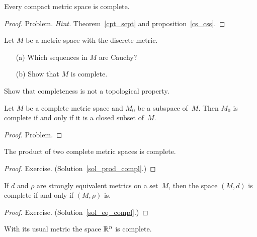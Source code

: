 \begin{prop}\label{prop_cpt_impl_cmpl} Every compact metric space is complete.
\end{prop}

\begin{proof} Problem. \emph{Hint.} Theorem~\ref{cpt_scpt} and
proposition~\ref{cs_css}.  \ns  \end{proof}

\begin{prob} Let $M$ be a metric space with the discrete metric.
 \begin{enumerate}
  \item[(a)] Which sequences in $M$ are Cauchy?
  \item[(b)] Show that $M$ is complete.
 \end{enumerate}
\end{prob}

\begin{prob} Show that completeness is not a topological property.
\end{prob}

\begin{prop}\label{prop_clss_ms} Let $M$ be a complete metric space and $M_0$ be a subspace
of~$M$.  Then $M_0$ is complete if and only if it is a closed subset of~$M$.
\end{prop}

\begin{proof} Problem.  \ns  \end{proof}

\begin{prop}\label{prod_compl} The product of two complete metric spaces is complete.
\end{prop}

\begin{proof} Exercise. (Solution~\ref{sol_prod_compl}.)  \ns  \end{proof}

\begin{prop}\label{eq_compl} If $d$ and $\rho$ are strongly equivalent metrics on a
set~$M$, then the space $(M,d)$ is complete if and only if $(M,\rho)$ is.
\end{prop}

\begin{proof} Exercise. (Solution~\ref{sol_eq_compl}.)  \ns  \end{proof}

\begin{exam}\label{Rn_compl} With its usual metric the space $\mathbb{R}^n$
is complete.
\end{exam}

